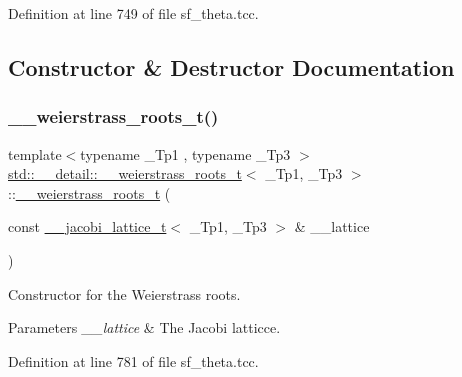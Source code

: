 Definition at line 749 of file sf\+\_\+theta.\+tcc.



\subsection{Constructor \& Destructor Documentation}
\mbox{\label{structstd_1_1____detail_1_1____weierstrass__roots__t_ae198e5213d170ad03e1b33f2a2bd4755}} 
\subsubsection{\texorpdfstring{\+\_\+\+\_\+weierstrass\+\_\+roots\+\_\+t()}{\_\_weierstrass\_roots\_t()}\hspace{0.1cm}{\footnotesize\ttfamily [1/2]}}
{\footnotesize\ttfamily template$<$typename \+\_\+\+Tp1 , typename \+\_\+\+Tp3 $>$ \\
\hyperlink{structstd_1_1____detail_1_1____weierstrass__roots__t}{std\+::\+\_\+\+\_\+detail\+::\+\_\+\+\_\+weierstrass\+\_\+roots\+\_\+t}$<$ \+\_\+\+Tp1, \+\_\+\+Tp3 $>$\+::\hyperlink{structstd_1_1____detail_1_1____weierstrass__roots__t}{\+\_\+\+\_\+weierstrass\+\_\+roots\+\_\+t} (\begin{DoxyParamCaption}\item[{const \hyperlink{structstd_1_1____detail_1_1____jacobi__lattice__t}{\+\_\+\+\_\+jacobi\+\_\+lattice\+\_\+t}$<$ \+\_\+\+Tp1, \+\_\+\+Tp3 $>$ \&}]{\+\_\+\+\_\+lattice }\end{DoxyParamCaption})\hspace{0.3cm}{\ttfamily [explicit]}}

Constructor for the Weierstrass roots.


\begin{DoxyParams}{Parameters}
{\em \+\_\+\+\_\+lattice} & The Jacobi latticce. \\
\hline
\end{DoxyParams}


Definition at line 781 of file sf\+\_\+theta.\+tcc.



